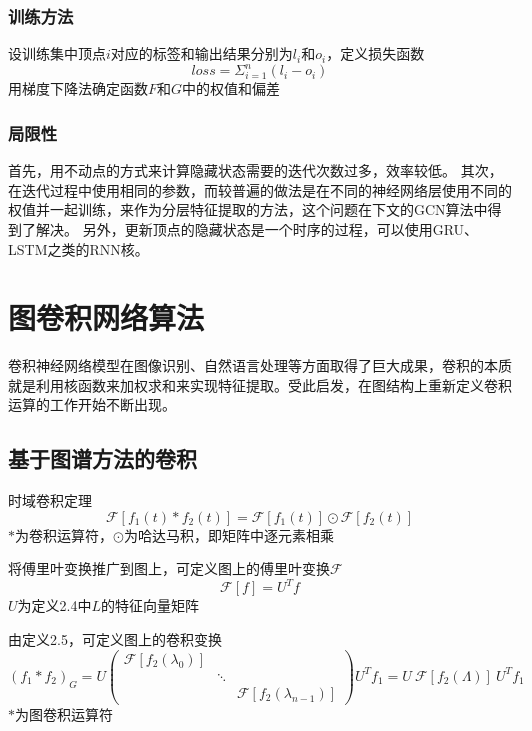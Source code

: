 \subsubsection{训练方法}
设训练集中顶点$i$对应的标签和输出结果分别为$l_i$和$o_i$，定义损失函数
\begin{equation}
    loss=\Sigma ^n_{i=1} (l_i-o_i)
\end{equation}
用梯度下降法确定函数$F$和$G$中的权值和偏差

\subsubsection{局限性}
首先，用不动点的方式来计算隐藏状态需要的迭代次数过多，效率较低。
其次，在迭代过程中使用相同的参数，而较普遍的做法是在不同的神经网络层使用不同的权值并一起训练，来作为分层特征提取的方法，这个问题在下文的GCN算法中得到了解决。
另外，更新顶点的隐藏状态是一个时序的过程，可以使用GRU、LSTM之类的RNN核。

\section{图卷积网络算法}
卷积神经网络模型在图像识别、自然语言处理等方面取得了巨大成果，卷积的本质就是利用核函数来加权求和来实现特征提取。受此启发，在图结构上重新定义卷积运算的工作开始不断出现。

\subsection{基于图谱方法的卷积}

\begin{theorem}
    时域卷积定理
    \begin{equation}
        \mathcal{F}\left[f_{1}(t) * f_{2}(t)\right]=\mathcal{F}\left[f_{1}(t)\right] \odot \mathcal{F}\left[f_{2}(t)\right]
    \end{equation}
    $*$为卷积运算符，$\odot$为哈达马积，即矩阵中逐元素相乘
\end{theorem}

\begin{definition}
    将傅里叶变换推广到图上，可定义图上的傅里叶变换$\mathcal{F}$
    \begin{equation}
        \mathcal{F}[f]=U^Tf
    \end{equation}
    $U$为定义2.4中$L$的特征向量矩阵
\end{definition}

\begin{definition}
    由定义2.5，可定义图上的卷积变换
    \begin{equation}
        (f_1*f_2)_G=U\left(\begin{array}{ccc}
            \mathcal{F}[f_2(\lambda_0)] & & \\
            & \ddots & \\
            & & \mathcal{F}[f_2(\lambda_{n-1})]
            \end{array}\right)U^Tf_1=U\ \mathcal{F}[f_2(\Lambda)]\ U^Tf_1
    \end{equation}
    $*$为图卷积运算符
\end{definition}

